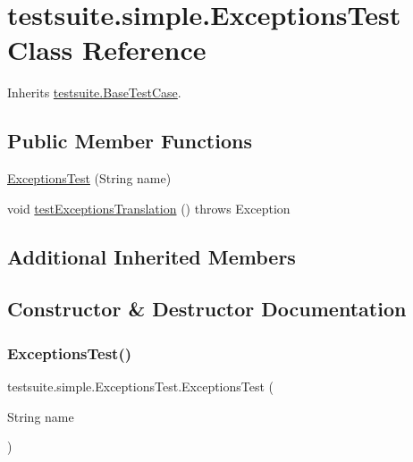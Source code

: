 \hypertarget{classtestsuite_1_1simple_1_1_exceptions_test}{}\section{testsuite.\+simple.\+Exceptions\+Test Class Reference}
\label{classtestsuite_1_1simple_1_1_exceptions_test}


Inherits \mbox{\hyperlink{classtestsuite_1_1_base_test_case}{testsuite.\+Base\+Test\+Case}}.

\subsection*{Public Member Functions}
\begin{DoxyCompactItemize}
\item 
\mbox{\hyperlink{classtestsuite_1_1simple_1_1_exceptions_test_a01ec3db7b2ee7155eb0fa1ef1bd1e072}{Exceptions\+Test}} (String name)
\item 
void \mbox{\hyperlink{classtestsuite_1_1simple_1_1_exceptions_test_a48e04060b958bc121cef6f69ae51f6a5}{test\+Exceptions\+Translation}} ()  throws Exception 
\end{DoxyCompactItemize}
\subsection*{Additional Inherited Members}


\subsection{Constructor \& Destructor Documentation}
\mbox{\label{classtestsuite_1_1simple_1_1_exceptions_test_a01ec3db7b2ee7155eb0fa1ef1bd1e072}} 
\subsubsection{\texorpdfstring{Exceptions\+Test()}{ExceptionsTest()}}
{\footnotesize\ttfamily testsuite.\+simple.\+Exceptions\+Test.\+Exceptions\+Test (\begin{DoxyParamCaption}\item[{String}]{name }\end{DoxyParamCaption})}



